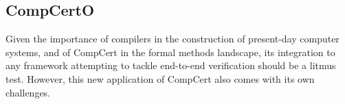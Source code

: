 \documentclass[draft,11pt]{report}
\theoremstyle{definition}
\begin{document}



\subsection{CompCertO} %

Given the importance of compilers in
the construction of present-day computer systems,
and of CompCert in the formal methods landscape,
its integration to any framework
attempting to tackle end-to-end verification
should be a litmus test.
However, this new application of CompCert also
comes with its own challenges.
\end{document}
